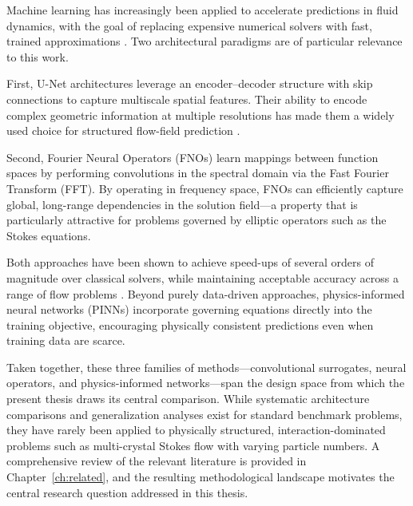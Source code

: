Machine learning has increasingly been applied to accelerate predictions in fluid dynamics, with the goal of replacing expensive numerical solvers with fast, trained approximations \parencite{guo_convolutional_2016,thuerey_deep_2020,lu_comprehensive_2022}. Two architectural paradigms are of particular relevance to this work.

First, U-Net architectures \parencite{ronneberger_u-net_2015} leverage an encoder--decoder structure with skip connections to capture multiscale spatial features. Their ability to encode complex geometric information at multiple resolutions has made them a widely used choice for structured flow-field prediction \parencite{guo_convolutional_2016,thuerey_deep_2020,ribeiro_deepcfd_nodate,chen_u-net_nodate}.

Second, Fourier Neural Operators (FNOs) \parencite{li_fourier_2021} learn mappings between function spaces by performing convolutions in the spectral domain via the Fast Fourier Transform (FFT). By operating in frequency space, FNOs can efficiently capture global, long-range dependencies in the solution field—a property that is particularly attractive for problems governed by elliptic operators such as the Stokes equations.

Both approaches have been shown to achieve speed-ups of several orders of magnitude over classical solvers, while maintaining acceptable accuracy across a range of flow problems \parencite{guo_convolutional_2016,thuerey_deep_2020,li_fourier_2021}. Beyond purely data-driven approaches, physics-informed neural networks (PINNs) \parencite{raissi_physics_2017,raissi_physics-informed_2019,jin_nsfnets_2021} incorporate governing equations directly into the training objective, encouraging physically consistent predictions even when training data are scarce.

Taken together, these three families of methods—convolutional surrogates, neural operators, and physics-informed networks—span the design space from which the present thesis draws its central comparison. While systematic architecture comparisons \parencite{lu_comprehensive_2022} and generalization analyses \parencite{morimoto_generalization_2022} exist for standard benchmark problems, they have rarely been applied to physically structured, interaction-dominated problems such as multi-crystal Stokes flow with varying particle numbers. A comprehensive review of the relevant literature is provided in Chapter~\ref{ch:related}, and the resulting methodological landscape motivates the central research question addressed in this thesis.

